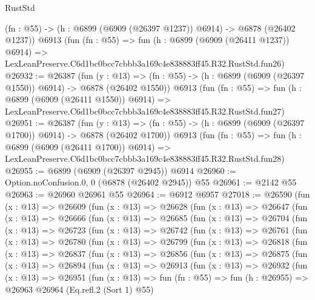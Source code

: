 \begin{lexlean}{RustStd}
\begin{coremodule}
    (fn : @55) -> (h : @6899 (@6909 (@26397 @1237)) @6914) -> @6878 (@26402 @1237))
    @6913
    (fun (fn : @55) =>
    fun (h : @6899 (@6909 (@26411 @1237)) @6914) =>
    LexLeanPreserve.C6d1bc0bcc7cbbb3a169c4e838883ff45.R32.RustStd.fun26)
@26932 := @26387
    (fun (y : @13) =>
    (fn : @55) -> (h : @6899 (@6909 (@26397 @1550)) @6914) -> @6878 (@26402 @1550))
    @6913
    (fun (fn : @55) =>
    fun (h : @6899 (@6909 (@26411 @1550)) @6914) =>
    LexLeanPreserve.C6d1bc0bcc7cbbb3a169c4e838883ff45.R32.RustStd.fun27)
@26951 := @26387
    (fun (y : @13) =>
    (fn : @55) -> (h : @6899 (@6909 (@26397 @1700)) @6914) -> @6878 (@26402 @1700))
    @6913
    (fun (fn : @55) =>
    fun (h : @6899 (@6909 (@26411 @1700)) @6914) =>
    LexLeanPreserve.C6d1bc0bcc7cbbb3a169c4e838883ff45.R32.RustStd.fun28)
@26955 := @6899 (@6909 (@26397 @2945)) @6914
@26960 := Option.noConfusion.{0, 0} (@6878 (@26402 @2945)) @55
@26961 := @2142 @55
@26963 := @26960 @26961 @55
@26964 := @6912 @6957
@27018 := @26590
    (fun (x : @13) =>
    @26609
      (fun (x : @13) =>
      @26628
        (fun (x : @13) =>
        @26647
          (fun (x : @13) =>
          @26666
            (fun (x : @13) =>
            @26685
              (fun (x : @13) =>
              @26704
                (fun (x : @13) =>
                @26723
                  (fun (x : @13) =>
                  @26742
                    (fun (x : @13) =>
                    @26761
                      (fun (x : @13) =>
                      @26780
                        (fun (x : @13) =>
                        @26799
                          (fun (x : @13) =>
                          @26818
                            (fun (x : @13) =>
                            @26837
                              (fun (x : @13) =>
                              @26856
                                (fun (x : @13) =>
                                @26875
                                  (fun (x : @13) =>
                                  @26894
                                    (fun (x : @13) =>
                                    @26913
                                      (fun (x : @13) =>
                                      @26932
                                        (fun (x : @13) =>
                                        @26951
                                          (fun (x : @13) =>
                                          fun (fn : @55) =>
                                          fun (h : @26955) =>
                                          @26963
                                            @26964
                                            (Eq.refl.{2} (Sort 1) @55)

\end{coremodule}
\end{lexlean}

